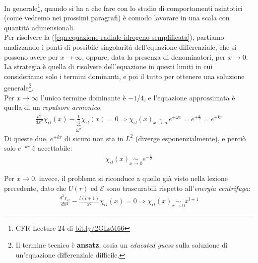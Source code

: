\documentclass[../../FisicaTeorica.tex]{subfiles}
\begin{document}
In generale\footnote{CFR Lecture 24 di \url{bit.ly/2GLsM66}}, quando si ha a che fare con lo studio di comportamenti asintotici (come vedremo nei prossimi paragrafi) è comodo lavorare in una scala  con quantità adimensionali.\\ %
Per risolvere la (\ref{eqn:equazione-radiale-idrogeno-semplificata}), partiamo analizzando i punti di possibile singolarità dell'equazione differenziale, che si possono avere per $x\to \infty$, oppure, data la presenza di denominatori, per $x\to 0$. La strategia è quella di risolvere  dell'equazione in questi limiti in cui consideriamo solo i termini dominanti, e poi  il tutto per ottenere una soluzione generale\footnote{Il termine tecnico è \textbf{ansatz}, ossia un \textit{educated guess} sulla soluzione di un'equazione differenziale difficile.}.\\

Per $x\to \infty$ l'unico termine dominante è $-1/4$, e l'equazione approssimata è quella di un \textit{repulsore armonico}:
\begin{align*}
\frac{d^2}{dx^2}\chi_{\epsilon l}(x) - \underbrace{\frac{1}{4}}_{\omega^2}\chi_{\epsilon l}(x) = 0 \Rightarrow  \chi_{\epsilon l}(x) \underset{x \to \infty}{\sim} e^{\pm\omega x} = e^{\pm\frac{x}{2}} = e^{\pm kr}
\end{align*}
Di queste due, $e^{+kr}$ di sicuro non sta in $L^2$ (diverge esponenzialmente), e perciò solo $e^{-kr}$ è accettabile:
\begin{align*}
\chi_{\epsilon l}(x) \underset{x \to 0}{\sim} e^{-\frac{x}{2}}
\end{align*}

Per $x\to 0$, invece, il problema si riconduce a quello già visto nella lezione precedente, dato che $U(r)$ ed $\mathcal{E}$ sono trascurabili rispetto all'\textit{energia centrifuga}:
\begin{align*}
\frac{d^2 \chi_{\epsilon l}}{dx^2} - \frac{l(l+1)}{x^2}\chi_{\epsilon l} (x) = 0 \Rightarrow  \chi_{\epsilon l}(x) \underset{x\to 0}{\sim} x^{l+1}
\end{align*}
\end{document}
